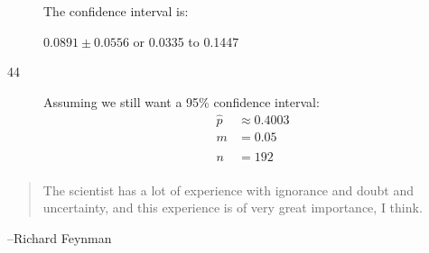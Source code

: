 \documentclass[letterpaper]{exam}
\begin{document}
\begin{description}
        The confidence interval is: 

        $0.0891 \pm 0.0556$ or 0.0335 to 0.1447

      \item[44]
        Assuming we still want a 95\% confidence interval:
        \begin{align*}
          \hat{p} & \approx 0.4003 \\
          m       & = 0.05 \\
          \\
          n &= \boxed{ 192 } \\
        \end{align*}


  \end{description}

  \else
    \vspace{12 cm}
    \begin{quote}
      \begin{em}
        The scientist has a lot of experience with ignorance and doubt and
        uncertainty, and this experience is of very great importance, I think.
      \end{em}
    \end{quote}
    \hspace{1 cm}--Richard Feynman
  \fi
\end{document}
